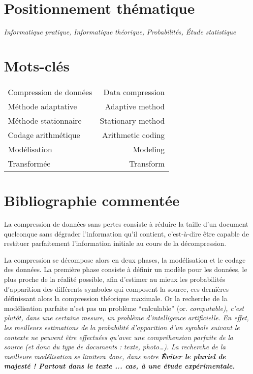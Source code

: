 \documentclass[a4paper, 11pt]{article}
\begin{document}


\section*{Positionnement thématique}

\hspace{1cm} {\itshape
Informatique pratique, Informatique théorique, Probabilités, \'Etude statistique
}

\section*{Mots-clés}

\hspace{1cm} {\large \begin{tabular}{|lr|}
Compression de données & Data compression \\
Méthode adaptative & Adaptive method \\
Méthode stationnaire & Stationary method \\
Codage arithmétique & Arithmetic coding \\
Modélisation & Modeling \\
Transformée & Transform \\
\end{tabular}}

\section*{Bibliographie commentée}

La compression de données sans pertes consiste à réduire la taille d'un document quelconque sans dégrader l'information qu'il contient, c'est-à-dire être capable de restituer parfaitement l'information initiale au cours de la décompression.

\vspace{0.2cm}

La compression se décompose alors en deux phases, la modélisation et le codage des données. La première phase consiste à définir un modèle pour les données, le plus proche de la réalité possible, afin d'estimer au mieux les probabilités d'apparition des différents symboles qui composent la source, ces dernières définissant alors la compression théorique maximale. Or la recherche de la modélisation parfaite n'est pas un problème ``calculable'' (or. \it{computable}), c'est plutôt, dans une certaine mesure, un problème d'intelligence artificielle. En effet, les meilleurs estimations de la probabilité d'apparition d'un symbole suivant le contexte ne peuvent être effectuées qu'avec une compréhension parfaite de la source (et donc du type de documents : texte, photo\ldots{}). La recherche de la meilleure modélisation se limitera donc, dans notre \bf{\red \'Eviter le pluriel de majest\'e ! Partout dans le texte ...} cas, à une étude expérimentale.
\end{document}
